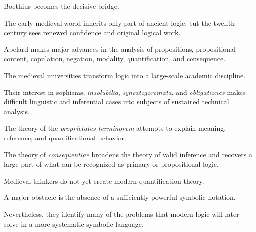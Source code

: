 \documentclass[11pt]{article}
\newcommand{\latin}[1]{\textit{#1}}
\begin{document}
Boethius becomes the decisive bridge.

The early medieval world inherits only part of ancient logic, but
the twelfth century sees renewed confidence and original logical
work.

Abelard makes major advances in the analysis of propositions,
propositional content, copulation, negation, modality,
quantification, and consequence.

The medieval universities transform logic into a large-scale
academic discipline.

Their interest in sophisms, \latin{insolubilia},
\latin{syncategoremata}, and \latin{obligationes} makes difficult
linguistic and inferential cases into subjects of sustained
technical analysis.

The theory of the \latin{proprietates terminorum} attempts to
explain meaning, reference, and quantificational behavior.

The theory of \latin{consequentiae} broadens the theory of valid
inference and recovers a large part of what can be recognized as
primary or propositional logic.

Medieval thinkers do not yet create modern quantification theory.

A major obstacle is the absence of a sufficiently powerful
symbolic notation.

Nevertheless, they identify many of the problems that modern logic
will later solve in a more systematic symbolic language.
\end{document}
